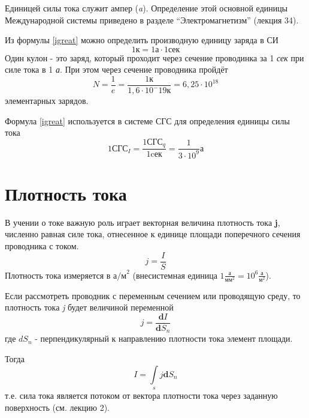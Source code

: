 \documentclass[a4paper,10pt]{book}
\begin{document}
Единицей силы тока служит ампер (\emph{a}). Определение этой основной единицы Международной системы приведено в разделе ``Электромагнетизм''
(лекция 34).

Из формулы \ref{igreat} можно определить производную единицу заряда в СИ
\begin{equation}
 1 \text{к} = 1 \text{а} \cdot 1 \text{сек} \nonumber
\end{equation}
Один кулон - это заряд, который проходит через сечение проводинка за 1 \emph{сек} при силе тока в 1 \emph{а}. При этом через сечение проводника пройдёт 
\begin{equation}
 N = \frac{1}{e} = \frac{1 \text{к}}{1,6 \cdot 10^-19 \text{к}} = 6,25 \cdot 10^18 \nonumber
\end{equation}
элементарных зарядов.

Формула \ref{igreat} используется в системе СГС для определения единицы силы тока
\begin{equation}\label{sgsamp}
  1\text{СГС}_I = \frac{1\text{СГС}_q}{1 \text{cек}} = \frac{1}{3 \cdot 10^9} \text{а}
\end{equation}
\section{Плотность тока}
В учении о токе важную роль играет векторная величина плотность тока \textbf{j}, численно равная силе тока, отнесенное к единице площади поперечного сечения проводника с током.
\begin{equation}\label{ji}
 j = \frac{I}{S}
\end{equation}
Плотность тока измеряется в $\text{а/м}^2$ (внесистемная единица $1\frac{\text{а}}{\text{мм}^2} = 10^6\frac{\text{а}}{\text{м}^2}$).

Если рассмотреть проводник с переменным сечением или проводящую среду, то плотность тока \emph{j} будет величиной переменной
\begin{equation}\label{dencity}
 j = \frac{\mathbf{d}I}{\mathbf{d}S_n}
\end{equation}
где $dS_n$ - перпендикулярный к направлению плотности тока элемент площади.

Тогда
\begin{equation}\label{inti}
 I = \int\limits_{s}j\mathbf{d}S_n
\end{equation}
т.е. сила тока является потоком от вектора плотности тока через заданную поверхность (см. лекцию 2).
\end{document}
